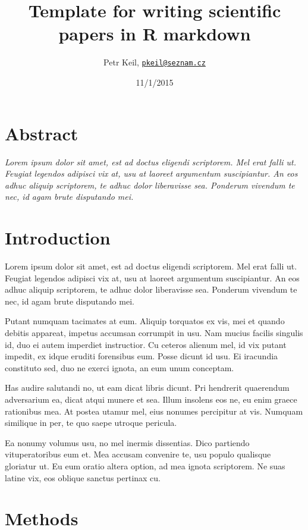 \documentclass[]{article}
\title{Template for writing scientific papers in R markdown}
\author{Petr Keil, \href{mailto:pkeil@seznam.cz}{\nolinkurl{pkeil@seznam.cz}}}
\date{11/1/2015}
\begin{document}
\maketitle


\section{Abstract}\label{abstract}

\emph{Lorem ipsum dolor sit amet, est ad doctus eligendi scriptorem. Mel
erat falli ut. Feugiat legendos adipisci vix at, usu at laoreet
argumentum suscipiantur. An eos adhuc aliquip scriptorem, te adhuc dolor
liberavisse sea. Ponderum vivendum te nec, id agam brute disputando
mei.}

\section{Introduction}\label{introduction}

Lorem ipsum dolor sit amet, est ad doctus eligendi scriptorem. Mel erat
falli ut. Feugiat legendos adipisci vix at, usu at laoreet argumentum
suscipiantur. An eos adhuc aliquip scriptorem, te adhuc dolor
liberavisse sea. Ponderum vivendum te nec, id agam brute disputando mei.

Putant numquam tacimates at eum. Aliquip torquatos ex vis, mei et quando
debitis appareat, impetus accumsan corrumpit in usu. Nam mucius facilis
singulis id, duo ei autem imperdiet instructior. Cu ceteros alienum mel,
id vix putant impedit, ex idque eruditi forensibus eum. Posse dicunt id
usu. Ei iracundia constituto sed, duo ne exerci ignota, an eum unum
conceptam.

Has audire salutandi no, ut eam dicat libris dicunt. Pri hendrerit
quaerendum adversarium ea, dicat atqui munere et sea. Illum insolens eos
ne, eu enim graece rationibus mea. At postea utamur mel, eius nonumes
percipitur at vis. Numquam similique in per, te quo saepe utroque
pericula.

Ea nonumy volumus usu, no mel inermis dissentias. Dico partiendo
vituperatoribus eum et. Mea accusam convenire te, usu populo qualisque
gloriatur ut. Eu eum oratio altera option, ad mea ignota scriptorem. Ne
suas latine vix, eos oblique sanctus pertinax cu.

\section{Methods}\label{methods}
\end{document}
